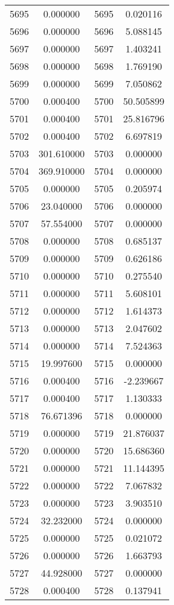 \documentclass[12pt]{article}
\begin{document}
\begin{longtable}{@{}cccc@{}}
5695 & 0.000000 & 5695 & 0.020116 \\
5696 & 0.000000 & 5696 & 5.088145 \\
5697 & 0.000000 & 5697 & 1.403241 \\
5698 & 0.000000 & 5698 & 1.769190 \\
5699 & 0.000000 & 5699 & 7.050862 \\
5700 & 0.000400 & 5700 & 50.505899 \\
5701 & 0.000400 & 5701 & 25.816796 \\
5702 & 0.000400 & 5702 & 6.697819 \\
5703 & 301.610000 & 5703 & 0.000000 \\
5704 & 369.910000 & 5704 & 0.000000 \\
5705 & 0.000000 & 5705 & 0.205974 \\
5706 & 23.040000 & 5706 & 0.000000 \\
5707 & 57.554000 & 5707 & 0.000000 \\
5708 & 0.000000 & 5708 & 0.685137 \\
5709 & 0.000000 & 5709 & 0.626186 \\
5710 & 0.000000 & 5710 & 0.275540 \\
5711 & 0.000000 & 5711 & 5.608101 \\
5712 & 0.000000 & 5712 & 1.614373 \\
5713 & 0.000000 & 5713 & 2.047602 \\
5714 & 0.000000 & 5714 & 7.524363 \\
5715 & 19.997600 & 5715 & 0.000000 \\
5716 & 0.000400 & 5716 & -2.239667 \\
5717 & 0.000400 & 5717 & 1.130333 \\
5718 & 76.671396 & 5718 & 0.000000 \\
5719 & 0.000000 & 5719 & 21.876037 \\
5720 & 0.000000 & 5720 & 15.686360 \\
5721 & 0.000000 & 5721 & 11.144395 \\
5722 & 0.000000 & 5722 & 7.067832 \\
5723 & 0.000000 & 5723 & 3.903510 \\
5724 & 32.232000 & 5724 & 0.000000 \\
5725 & 0.000000 & 5725 & 0.021072 \\
5726 & 0.000000 & 5726 & 1.663793 \\
5727 & 44.928000 & 5727 & 0.000000 \\
5728 & 0.000400 & 5728 & 0.137941 \\

\end{longtable}
\end{document}
